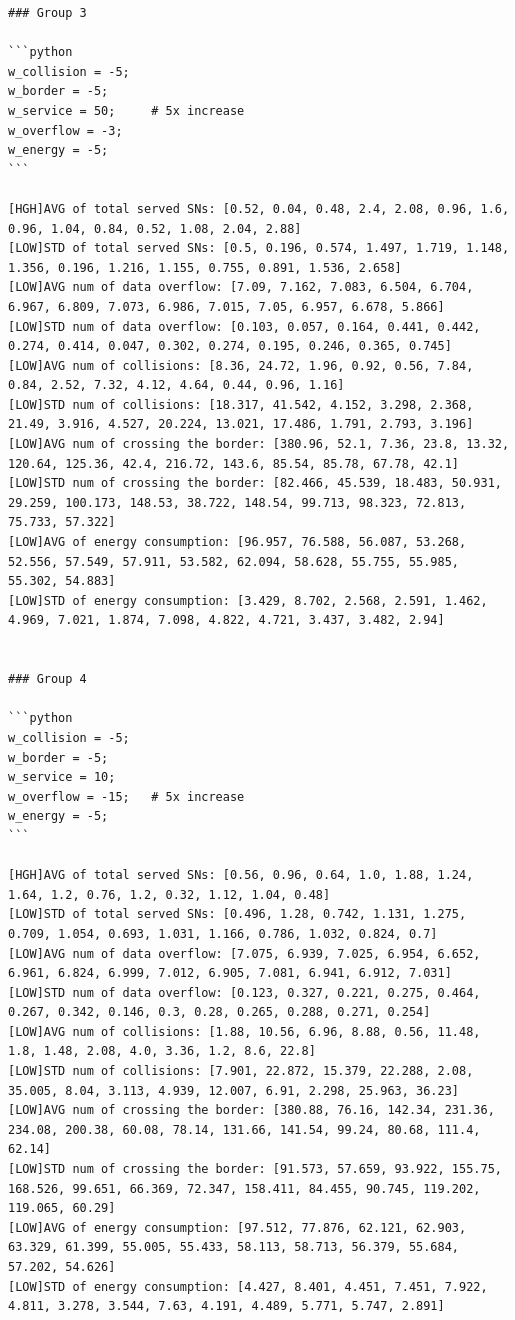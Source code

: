 \documentclass{article}
\begin{document}
\begin{verbatim}
### Group 3

```python
w_collision = -5;
w_border = -5;
w_service = 50;     # 5x increase
w_overflow = -3;
w_energy = -5;
```

[HGH]AVG of total served SNs: [0.52, 0.04, 0.48, 2.4, 2.08, 0.96, 1.6, 0.96, 1.04, 0.84, 0.52, 1.08, 2.04, 2.88]
[LOW]STD of total served SNs: [0.5, 0.196, 0.574, 1.497, 1.719, 1.148, 1.356, 0.196, 1.216, 1.155, 0.755, 0.891, 1.536, 2.658]
[LOW]AVG num of data overflow: [7.09, 7.162, 7.083, 6.504, 6.704, 6.967, 6.809, 7.073, 6.986, 7.015, 7.05, 6.957, 6.678, 5.866]
[LOW]STD num of data overflow: [0.103, 0.057, 0.164, 0.441, 0.442, 0.274, 0.414, 0.047, 0.302, 0.274, 0.195, 0.246, 0.365, 0.745]
[LOW]AVG num of collisions: [8.36, 24.72, 1.96, 0.92, 0.56, 7.84, 0.84, 2.52, 7.32, 4.12, 4.64, 0.44, 0.96, 1.16]
[LOW]STD num of collisions: [18.317, 41.542, 4.152, 3.298, 2.368, 21.49, 3.916, 4.527, 20.224, 13.021, 17.486, 1.791, 2.793, 3.196]
[LOW]AVG num of crossing the border: [380.96, 52.1, 7.36, 23.8, 13.32, 120.64, 125.36, 42.4, 216.72, 143.6, 85.54, 85.78, 67.78, 42.1]
[LOW]STD num of crossing the border: [82.466, 45.539, 18.483, 50.931, 29.259, 100.173, 148.53, 38.722, 148.54, 99.713, 98.323, 72.813, 75.733, 57.322]
[LOW]AVG of energy consumption: [96.957, 76.588, 56.087, 53.268, 52.556, 57.549, 57.911, 53.582, 62.094, 58.628, 55.755, 55.985, 55.302, 54.883]
[LOW]STD of energy consumption: [3.429, 8.702, 2.568, 2.591, 1.462, 4.969, 7.021, 1.874, 7.098, 4.822, 4.721, 3.437, 3.482, 2.94]


### Group 4

```python
w_collision = -5;
w_border = -5;
w_service = 10;
w_overflow = -15;   # 5x increase
w_energy = -5;
```

[HGH]AVG of total served SNs: [0.56, 0.96, 0.64, 1.0, 1.88, 1.24, 1.64, 1.2, 0.76, 1.2, 0.32, 1.12, 1.04, 0.48]
[LOW]STD of total served SNs: [0.496, 1.28, 0.742, 1.131, 1.275, 0.709, 1.054, 0.693, 1.031, 1.166, 0.786, 1.032, 0.824, 0.7]
[LOW]AVG num of data overflow: [7.075, 6.939, 7.025, 6.954, 6.652, 6.961, 6.824, 6.999, 7.012, 6.905, 7.081, 6.941, 6.912, 7.031]
[LOW]STD num of data overflow: [0.123, 0.327, 0.221, 0.275, 0.464, 0.267, 0.342, 0.146, 0.3, 0.28, 0.265, 0.288, 0.271, 0.254]
[LOW]AVG num of collisions: [1.88, 10.56, 6.96, 8.88, 0.56, 11.48, 1.8, 1.48, 2.08, 4.0, 3.36, 1.2, 8.6, 22.8]
[LOW]STD num of collisions: [7.901, 22.872, 15.379, 22.288, 2.08, 35.005, 8.04, 3.113, 4.939, 12.007, 6.91, 2.298, 25.963, 36.23]
[LOW]AVG num of crossing the border: [380.88, 76.16, 142.34, 231.36, 234.08, 200.38, 60.08, 78.14, 131.66, 141.54, 99.24, 80.68, 111.4, 62.14]
[LOW]STD num of crossing the border: [91.573, 57.659, 93.922, 155.75, 168.526, 99.651, 66.369, 72.347, 158.411, 84.455, 90.745, 119.202, 119.065, 60.29]
[LOW]AVG of energy consumption: [97.512, 77.876, 62.121, 62.903, 63.329, 61.399, 55.005, 55.433, 58.113, 58.713, 56.379, 55.684, 57.202, 54.626]
[LOW]STD of energy consumption: [4.427, 8.401, 4.451, 7.451, 7.922, 4.811, 3.278, 3.544, 7.63, 4.191, 4.489, 5.771, 5.747, 2.891]


\end{verbatim}
\end{document}
